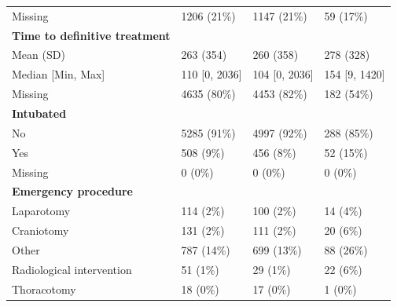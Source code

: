 \documentclass[12pt, letterpaper]{article}
\begin{document}
\begin{table}
{\begin{tabular}{llll}
            \hspace{3mm}Missing                           & 1206 (21\%)      & 1147 (21\%)     & 59 (17\%)     \\
            \textbf{Time to definitive treatment}         &                  &                 &               \\
            \hspace{3mm}Mean (SD)                         & 263 (354)        & 260 (358)       & 278 (328)     \\
            \hspace{3mm}Median [Min, Max]                 & 110 [0, 2036]    & 104 [0, 2036]   & 154 [9, 1420] \\
            \hspace{3mm}Missing                           & 4635 (80\%)      & 4453 (82\%)     & 182 (54\%)    \\
            \textbf{Intubated}                            &                  &                 &               \\
            \hspace{3mm}No                                & 5285 (91\%)      & 4997 (92\%)     & 288 (85\%)    \\
            \hspace{3mm}Yes                               & 508 (9\%)        & 456 (8\%)       & 52 (15\%)     \\
            \hspace{3mm}Missing                           & 0 (0\%)          & 0 (0\%)         & 0 (0\%)       \\
            \textbf{Emergency procedure}                  &                  &                 &               \\
            \hspace{3mm}Laparotomy                        & 114 (2\%)        & 100 (2\%)       & 14 (4\%)      \\
            \hspace{3mm}Craniotomy                        & 131 (2\%)        & 111 (2\%)       & 20 (6\%)      \\
            \hspace{3mm}Other                             & 787 (14\%)       & 699 (13\%)      & 88 (26\%)     \\
            \hspace{3mm}Radiological intervention         & 51 (1\%)         & 29 (1\%)        & 22 (6\%)      \\
            \hspace{3mm}Thoracotomy                       & 18 (0\%)         & 17 (0\%)        & 1 (0\%)       \\

\end{tabular}}
\end{table}
\end{document}
